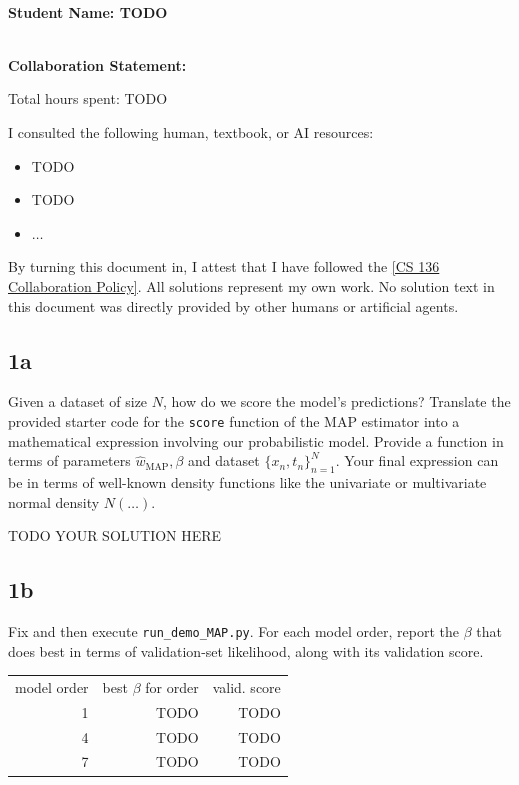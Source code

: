 \documentclass[10pt]{article}
\newcommand{\officialdirections}[1]{{\color{purple} #1}}
\begin{document}
~\\ %
{\Large{\bf Student Name: TODO}}

~\\ %
{\bf Collaboration Statement:}

Total hours spent: TODO

I consulted the following human, textbook, or AI resources:
\begin{itemize}
\item TODO
\item TODO
\item $\ldots$	
\end{itemize}

By turning this document in, I attest that I have followed the 
\href{https://www.cs.tufts.edu/cs/136/2026f/index.html#collaboration}{[CS 136 Collaboration Policy]}. All solutions represent my own work. No solution text in this document was directly provided by other humans or artificial agents. 

\setcounter{tocdepth}{2}
\tableofcontents

\newpage

\subsection{1a}
\officialdirections{
Given a dataset of size $N$, how do we score the model's predictions? Translate the provided starter code for the \texttt{score} function of the MAP estimator into a mathematical expression involving our probabilistic model. Provide a function in terms of parameters $\hat{w}_{\text{MAP}}, \beta$ and dataset $\{x_n, t_n \}_{n=1}^N$. Your final expression can be in terms of well-known density functions like the univariate or multivariate normal density $N(\ldots)$.
}

TODO YOUR SOLUTION HERE

\subsection{1b}
\officialdirections{Fix and then execute \texttt{run\_demo\_MAP.py}. For each model order, report the $\beta$ that does best in terms of validation-set likelihood, along with its validation score.}

\begin{table}[!h]
\begin{tabular}{r r r}
model order & best $\beta$ for order & valid. score
\\
1 & TODO & TODO 
\\
4 & TODO & TODO 
\\
7 & TODO & TODO
\end{tabular}
\end{table}
\end{document}
